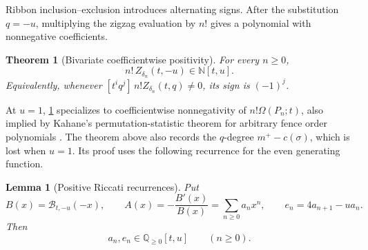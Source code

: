 \documentclass{amsart}
\newtheorem{theorem}{Theorem}[section]
\newtheorem{lemma}[lemma]{Lemma}
\theoremstyle{definition}
\theoremstyle{remark}
\begin{document}
Ribbon inclusion--exclusion introduces alternating signs.  After the
substitution $q=-u$, multiplying the zigzag evaluation by $n!$ gives a
polynomial with nonnegative coefficients.

\begin{theorem}[Bivariate coefficientwise positivity]
\label{thm:cycle-sign-coherence}
For every \(n\geq0\),
\begin{equation}
 n!\,Z_{\delta_n}(t,-u)\in\mathbb N[t,u].
 \label{eq:cycle-sign-coherence}
\end{equation}
Equivalently, whenever
\([t^iq^j]\,n!Z_{\delta_n}(t,q)\neq0\), its sign is \((-1)^j\).
\end{theorem}

At \(u=1\), \cref{thm:cycle-sign-coherence} specializes to coefficientwise
nonnegativity of \(n!\Omega(P_n;t)\), also implied by Kahane's
permutation-statistic theorem for arbitrary fence order polynomials
\cite{KahaneFenceCoefficients}.  The theorem above also records the
$q$-degree $m^+-c(\sigma)$, which is lost when $u=1$.  Its proof uses the
following recurrence for the even generating function.

\begin{lemma}[Positive Riccati recurrences]
\label{lem:bivariate-log-derivative-positivity}
Put
\[
 B(x)=\mathcal B_{t,-u}(-x),\qquad
 A(x)=-\frac{B'(x)}{B(x)}=\sum_{n\geq0}a_nx^n,
 \qquad
 e_n=4a_{n+1}-ua_n.
\]
Then
\[
 a_n,e_n\in\mathbb Q_{\geq0}[t,u]\qquad(n\geq0).
\]
\end{lemma}
\end{document}

